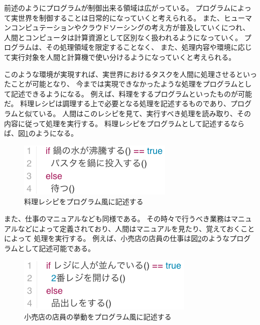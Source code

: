 前述のようにプログラムが制御出来る領域は広がっている。
プログラムによって実世界を制御することは日常的になっていくと考えられる。
また、ヒューマンコンピュテーションやクラウドソーシングの考え方が普及していくにつれ、
人間とコンピュータは計算資源として区別なく扱われるようになっていく。
プログラムは、その処理領域を限定することなく、
また、処理内容や環境に応じて実行対象を人間と計算機で使い分けるようになっていくと考えられる。

このような環境が実現すれば、実世界におけるタスクを人間に処理させるといったことが可能となり、
今までは実現できなかったような処理をプログラムとして記述できるようになる。
例えば、料理をするプログラムといったものが可能だ。
料理レシピは調理する上で必要となる処理を記述するものであり、プログラムと似ている。
人間はこのレシピを見て、実行すべき処理を読み取り、その内容に従って処理を実行する。
料理レシピをプログラムとして記述するならば、図\ref{fig:background_cooking}のようになる。

\begin{figure}[htbp]
  \begin{center}
  \includegraphics[width=.4\linewidth,bb=0 0 281 98]{images/background_cooking.js.png}
  \end{center}
  \caption{料理レシピをプログラム風に記述する}
  \label{fig:background_cooking}
\end{figure}

また、仕事のマニュアルなども同様である。
その時々で行うべき業務はマニュアルなどによって定義されており、人間はマニュアルを見たり、覚えておくことによって
処理を実行する。
例えば、小売店の店員の仕事は図\ref{fig:background_retail}のようなプログラムとして記述可能である。

\begin{figure}[htbp]
  \begin{center}
  \includegraphics[width=.4\linewidth,bb=0 0 319 98]{images/background_retail.js.png}
  \end{center}
  \caption{小売店の店員の挙動をプログラム風に記述する}
  \label{fig:background_retail}
\end{figure}


